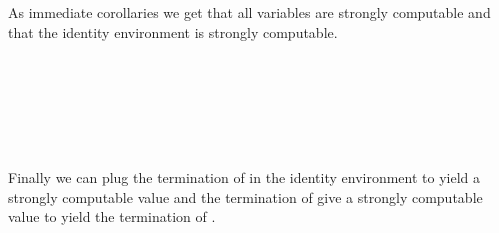 \documentclass[preliminary,copyright,creativecommons]{eptcs}
\newenvironment{code}{\verbatim}{\endverbatim}
\begin{document}
\noindent
As immediate corollaries we get that all variables are strongly
computable and that the identity environment is strongly computable.

\begin{code}\> \<[15]\>[15]\AgdaSymbol{:} \<[18]\>[18] \AgdaSymbol{\}(} \AgdaSymbol{:}   \AgdaSymbol{)}      \AgdaSymbol{(} \AgdaSymbol{)}\<\\
\>  \<[15]\>[15]\AgdaSymbol{=} \<[18]\>[18] \AgdaSymbol{\_} \AgdaSymbol{(} \AgdaSymbol{)} \AgdaSymbol{(}  \AgdaInductiveConstructor{,} \AgdaSymbol{)}\<\\
\\
\> \<[15]\>[15]\AgdaSymbol{:} \<[18]\>[18]      \AgdaSymbol{(} \AgdaSymbol{)}\<\\
\>  \<[15]\>[15]\AgdaSymbol{=} \<[18]\>[18]\AgdaSymbol{\_}\<\\
\> \AgdaSymbol{(} \AgdaInductiveConstructor{,} \AgdaSymbol{)} \<[15]\>[15]\AgdaSymbol{=} \<[18]\>[18]  \AgdaSymbol{(} \AgdaSymbol{)} \AgdaSymbol{(} \AgdaSymbol{)} \AgdaInductiveConstructor{,}  \<\end{code}

\noindent
Finally we can plug the termination of  in the identity
environment to yield a strongly computable value and the termination
of  give a strongly computable value to yield the
termination of .
\end{document}
